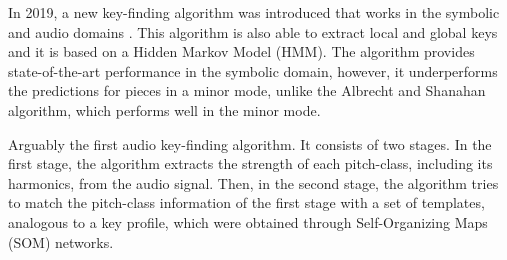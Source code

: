 


In 2019, a new key-finding algorithm was introduced that works in the symbolic and audio domains \cite{napoleslopez2019keyfinding}. This algorithm is also able to extract local and global keys and it is based on a Hidden Markov Model (HMM). The algorithm provides state-of-the-art performance in the symbolic domain, however, it underperforms the predictions for pieces in a minor mode, unlike the Albrecht and Shanahan algorithm, which performs well in the minor mode.




Arguably the first audio key-finding algorithm. It consists of two stages. In the first stage, the algorithm extracts the strength of each pitch-class, including its harmonics, from the audio signal. Then, in the second stage, the algorithm tries to match the pitch-class information of the first stage with a set of templates, analogous to a key profile, which were obtained through Self-Organizing Maps (SOM) networks. 


